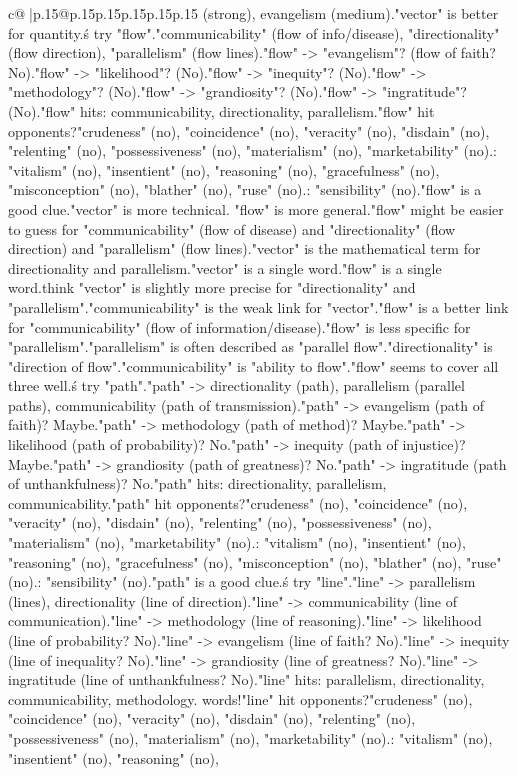 \documentclass{article}
\begin{document}
{\begin{supertabular}{c@{$\;$}|p{.15\linewidth}@{}p{.15\linewidth}p{.15\linewidth}p{.15\linewidth}p{.15\linewidth}p{.15\linewidth}}
{{{(strong), evangelism (medium).\n"vector" is better for quantity.\n\nLet\'s try "flow".\n"communicability" (flow of info/disease), "directionality" (flow direction), "parallelism" (flow lines).\n"flow" -> "evangelism"? (flow of faith? No).\n"flow" -> "likelihood"? (No).\n"flow" -> "inequity"? (No).\n"flow" -> "methodology"? (No).\n"flow" -> "grandiosity"? (No).\n"flow" -> "ingratitude"? (No).\n"flow" hits: communicability, directionality, parallelism.\nDoes "flow" hit opponents?\n"crudeness" (no), "coincidence" (no), "veracity" (no), "disdain" (no), "relenting" (no), "possessiveness" (no), "materialism" (no), "marketability" (no).\nDistractors: "vitalism" (no), "insentient" (no), "reasoning" (no), "gracefulness" (no), "misconception" (no), "blather" (no), "ruse" (no).\nKill: "sensibility" (no).\n"flow" is a good clue.\n"vector" is more technical. "flow" is more general.\n"flow" might be easier to guess for "communicability" (flow of disease) and "directionality" (flow direction) and "parallelism" (flow lines).\nBut "vector" is the mathematical term for directionality and parallelism.\n"vector" is a single word.\n"flow" is a single word.\nI think "vector" is slightly more precise for "directionality" and "parallelism".\n"communicability" is the weak link for "vector".\n"flow" is a better link for "communicability" (flow of information/disease).\nBut "flow" is less specific for "parallelism".\n"parallelism" is often described as "parallel flow".\n"directionality" is "direction of flow".\n"communicability" is "ability to flow".\n"flow" seems to cover all three well.\n\nLet\'s try "path".\n"path" -> directionality (path), parallelism (parallel paths), communicability (path of transmission).\n"path" -> evangelism (path of faith)? Maybe.\n"path" -> methodology (path of method)? Maybe.\n"path" -> likelihood (path of probability)? No.\n"path" -> inequity (path of injustice)? Maybe.\n"path" -> grandiosity (path of greatness)? No.\n"path" -> ingratitude (path of unthankfulness)? No.\n"path" hits: directionality, parallelism, communicability.\nDoes "path" hit opponents?\n"crudeness" (no), "coincidence" (no), "veracity" (no), "disdain" (no), "relenting" (no), "possessiveness" (no), "materialism" (no), "marketability" (no).\nDistractors: "vitalism" (no), "insentient" (no), "reasoning" (no), "gracefulness" (no), "misconception" (no), "blather" (no), "ruse" (no).\nKill: "sensibility" (no).\n"path" is a good clue.\n\nLet\'s try "line".\n"line" -> parallelism (lines), directionality (line of direction).\n"line" -> communicability (line of communication).\n"line" -> methodology (line of reasoning).\n"line" -> likelihood (line of probability? No).\n"line" -> evangelism (line of faith? No).\n"line" -> inequity (line of inequality? No).\n"line" -> grandiosity (line of greatness? No).\n"line" -> ingratitude (line of unthankfulness? No).\n"line" hits: parallelism, directionality, communicability, methodology. words!\nDoes "line" hit opponents?\n"crudeness" (no), "coincidence" (no), "veracity" (no), "disdain" (no), "relenting" (no), "possessiveness" (no), "materialism" (no), "marketability" (no).\nDistractors: "vitalism" (no), "insentient" (no), "reasoning" (no), }}}
\end{supertabular}}
\end{document}
